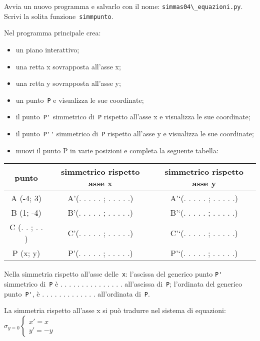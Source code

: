 Avvia un nuovo programma e salvarlo con il nome: 
\lstinline{simmas04\_equazioni.py}.
Scrivi la solita funzione~\lstinline{simmpunto}.

Nel programma principale crea:
\begin{itemize} [noitemsep]
\item un piano interattivo;
\item una retta x sovrapposta all'asse x;
\item una retta y sovrapposta all'asse y;
\item un punto~\lstinline{P} e visualizza le sue coordinate;
\item il punto~\lstinline{P'} simmetrico di~\lstinline{P} rispetto all'asse x
e visualizza le sue coordinate;
\item il punto~\lstinline{P''} simmetrico di~\lstinline{P} rispetto all'asse y
e visualizza le sue coordinate;
\item muovi il punto P in varie posizioni e completa la seguente tabella:

\end{itemize}

\begin{tabular}{|c|c|c|}
\hline

punto
 & 
simmetrico rispetto asse x
 & 
simmetrico rispetto asse y
\\
\hline
A (-4; 3)
 & 
A'(. . . . . ; . . . . .)
 & 
A'`(. . . . . ; . . . . .)
\\
\hline
B (1; -4)
 & 
B'(. . . . . ; . . . . .)
 & 
B'`(. . . . . ; . . . . .)
\\
\hline
C (. . ; . . )
 & 
C'(. . . . . ; . . . . .)
 & 
C'`(. . . . . ; . . . . .)
\\
\hline
P (x; y)
 & 
P'(. . . . . ; . . . . .)
 & 
P'`(. . . . . ; . . . . .)
\\
\hline\end{tabular}


Nella simmetria rispetto all'asse delle~\lstinline{x}:
l'ascissa del generico punto \lstinline{P'} simmetrico di~\lstinline{P} è . . . 
. . . . . . . . 
. . . .
all'ascissa di~\lstinline{P}; l'ordinata del generico punto~\lstinline{P'}, è . 
. . . 
. . . . . . . . .
all'ordinata di~\lstinline{P}.

La simmetria rispetto all'asse x si può tradurre nel sistema di equazioni:
\(\sigma_{y = 0} \left \{
\begin{array}{l}
x' = x \\
y' = -y
\end{array} \right .\)


